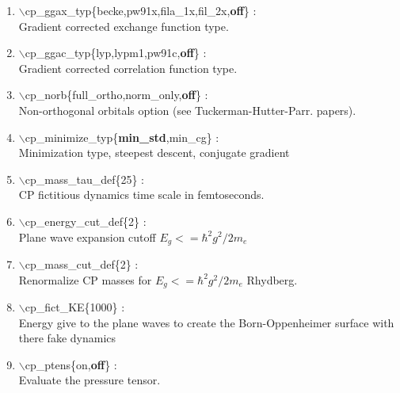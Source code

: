 \documentclass[12pt]{article}
\begin{document}
\begin{itemize}
\begin{enumerate}
 \vspace{0.15in} \Large
 \item  $\backslash$cp\_ggax\_typ\{becke,pw91x,fila\_1x,fil\_2x,{\bf off}\} : \\
    \large
     Gradient corrected exchange function type.

 \vspace{0.15in} \Large
 \item  $\backslash$cp\_ggac\_typ\{lyp,lypm1,pw91c,{\bf off}\} : \\
    \large
     Gradient corrected correlation function type.

 \vspace{0.15in} \Large
 \item  $\backslash$cp\_norb\{full\_ortho,norm\_only,{\bf off}\} : \\
    \large
     Non-orthogonal orbitals option (see Tuckerman-Hutter-Parr. papers).

 \vspace{0.15in} \Large
 \item  $\backslash$cp\_minimize\_typ\{{\bf min\_std},min\_cg\} : \\
    \large
      Minimization type, steepest descent, conjugate gradient 

 \vspace{0.15in} \Large
 \item  $\backslash$cp\_mass\_tau\_def\{25\} : \\
    \large
      CP fictitious dynamics time scale in femtoseconds.

 \vspace{0.15in} \Large
 \item  $\backslash$cp\_energy\_cut\_def\{2\} : \\
    \large
      Plane wave expansion cutoff $E_g<=\hbar^2g^2/2m_e$ 

 \vspace{0.15in} \Large
 \item  $\backslash$cp\_mass\_cut\_def\{2\} : \\
    \large
      Renormalize CP masses for $E_g<=\hbar^2g^2/2m_e$ Rhydberg.

 \vspace{0.15in} \Large
 \item  $\backslash$cp\_fict\_KE\{1000\} : \\
    \large
      Energy give to the plane waves to create the Born-Oppenheimer
      surface with there fake dynamics

 \vspace{0.15in} \Large
 \item  $\backslash$cp\_ptens\{on,{\bf off}\} : \\
    \large
      Evaluate the pressure tensor. 


\end{enumerate}
\end{itemize}
\end{document}
